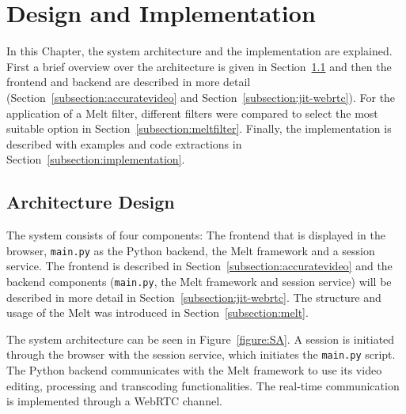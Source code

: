 \documentclass[../MasterThesis.tex]{subfiles}
\begin{document}
	
	
	
%
%
%
%
%
%
%
%
\newpage
\section{Design and Implementation} \label{section:designandimplementation}

In this Chapter, the system architecture and the implementation are explained. First a brief overview over the architecture is given in Section~\ref{subsection:architecturedesign} and then the frontend and backend are described in more detail (Section~\ref{subsection:accuratevideo} and Section~\ref{subsection:jit-webrtc}).
For the application of a Melt filter, different filters were compared to select the most suitable option in Section~\ref{subsection:meltfilter}. Finally, the implementation is described with examples and code extractions in Section~\ref{subsection:implementation}.





\subsection{Architecture Design} \label{subsection:architecturedesign}


The system consists of four components: The frontend that is displayed in the browser, \texttt{main.py} as the Python backend, the Melt framework and a session service. The frontend is described in Section~\ref{subsection:accuratevideo} and the backend components (\texttt{main.py}, the Melt framework and session service) will be described in more detail in Section~\ref{subsection:jit-webrtc}. The structure and usage of the Melt was introduced in Section~\ref{subsection:melt}.


The system architecture can be seen in Figure~\ref{figure:SA}.
A session is initiated through the browser with the session service, which initiates the \texttt{main.py} script.
The Python backend communicates with the Melt framework to use its video editing, processing and transcoding functionalities. The real-time communication is implemented through a WebRTC channel.
\end{document}
